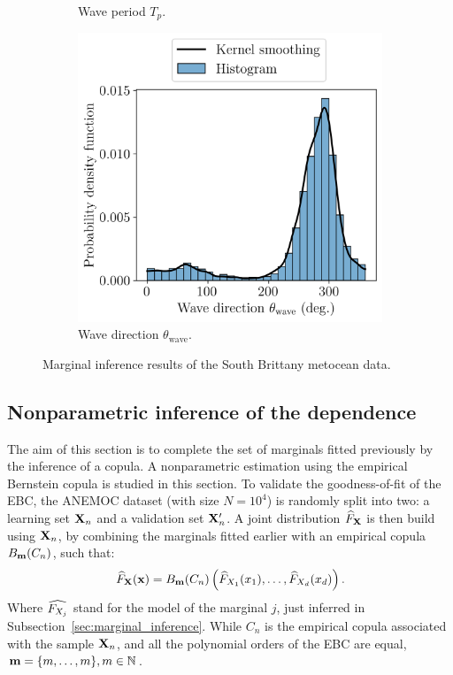 \begin{figure}
\begin{subfigure}[b]{0.32\textwidth}
        \caption{Wave period $T_p$.}
    \end{subfigure}
    \begin{subfigure}[b]{0.32\textwidth}
        \centering
        \includegraphics[width=\linewidth]{../numerical_experiments/chapter3/figures/wave_dir_distribution_SB.png}
        \caption{Wave direction $\theta_{\mathrm{wave}}$.}
    \end{subfigure}
    \caption{Marginal inference results of the South Brittany metocean data.}
    \label{fig:marginals_sb}
\end{figure}

\newpage
\subsection{Nonparametric inference of the dependence}

The aim of this section is to complete the set of marginals fitted previously by the inference of a copula. 
A nonparametric estimation using the empirical Bernstein copula is studied in this section. 
To validate the goodness-of-fit of the EBC, the ANEMOC dataset (with size $N=10^4$) is randomly split into two:
a learning set ${\bf X}_n$ and a validation set ${\bf X}_n'$. 
A joint distribution $\widehat{F}_{\bf X}$ is then build using ${\bf X}_n$, by combining the marginals fitted earlier with an empirical copula $B_{{\bf m}}(C_n)$, such that: 
\begin{equation}
    \widehat{F}_{\bf X}({\bf x}) = B_{{\bf m}}(C_n)\left(\widehat{F}_{X_1}(x_1), \dots, \widehat{F}_{X_d}(x_d)\right).
\end{equation}
Where $\widehat{F_{X_j}}$ stand for the model of the marginal $j$, just inferred in Subsection~\ref{sec:marginal_inference}. 
While $C_n$ is the empirical copula associated with the sample ${\bf X}_n$, and all the polynomial orders of the EBC are equal, ${\bf m} = \{m, \dots, m\}, m\in\mathbb{N}$.

